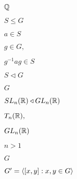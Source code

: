 \documentclass[10pt]{book}
\begin{document}
\begin{mdSnippets}
\begin{mdInlineSnippet}%
$\mathbb{Q}$\end{mdInlineSnippet}%
\begin{mdInlineSnippet}%
$S \le G$\end{mdInlineSnippet}%
\begin{mdInlineSnippet}[720de1f3d573e63e1b9fc7b2dca3275a]%
$a \in S$\end{mdInlineSnippet}%
\begin{mdInlineSnippet}[d9c46d375275854be64cd663e058368b]%
$g \in G,$\end{mdInlineSnippet}%
\begin{mdInlineSnippet}[7500929179427375f2dea763d9e98673]%
$g^{-1}ag \in S$\end{mdInlineSnippet}%
\begin{mdInlineSnippet}[fe81ed708909b26a7ddbdec0c73a36a6]%
$S \triangleleft G$\end{mdInlineSnippet}%
\begin{mdInlineSnippet}[dfcf28d0734569a6a693bc8194de62bf]%
$G$\end{mdInlineSnippet}%
\begin{mdInlineSnippet}[f9a9dd519768e37ad69d4a1b308bf10f]%
$SL_n(\mathbb{R}) \triangleleft GL_n(\mathbb{R})$\end{mdInlineSnippet}%
\begin{mdInlineSnippet}%
$T_n(\mathbb{R}),$\end{mdInlineSnippet}%
\begin{mdInlineSnippet}[16f20e52f211dc23b3ecfc45e052cf72]%
$GL_n(\mathbb{R})$\end{mdInlineSnippet}%
\begin{mdInlineSnippet}[b5483f2f1af0ee56acb54ef669929a57]%
$n > 1$\end{mdInlineSnippet}%
\begin{mdInlineSnippet}[dfcf28d0734569a6a693bc8194de62bf]%
$G$\end{mdInlineSnippet}%
\begin{mdInlineSnippet}[6090c9ae19a5c36f2b37a77d8c3db20d]%
$G' = \ev{[x,y] : x,y \in G}$\end{mdInlineSnippet}%

\end{mdSnippets}
\end{document}
